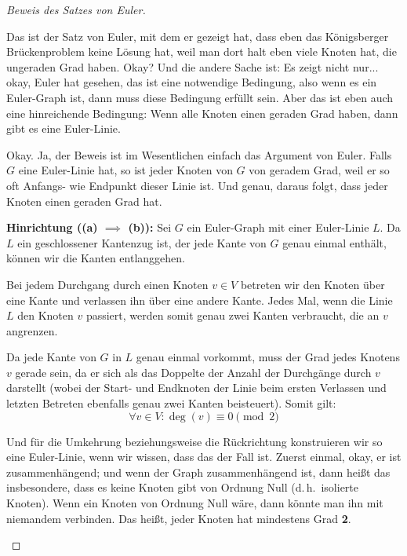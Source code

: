 \begin{proof}[Beweis des Satzes von Euler]
\begin{spoken-clean}[00:08:55 - 00:11:15]
Das ist der Satz von Euler, mit dem er gezeigt hat, dass eben das Königsberger Brückenproblem keine Lösung hat, weil man dort halt eben viele Knoten hat, die ungeraden Grad haben. Okay? Und die andere Sache ist: Es zeigt nicht nur... okay, Euler hat gesehen, das ist eine notwendige Bedingung, also wenn es ein Euler-Graph ist, dann muss diese Bedingung erfüllt sein. Aber das ist eben auch eine hinreichende Bedingung: Wenn alle Knoten einen geraden Grad haben, dann gibt es eine Euler-Linie.

Okay. Ja, der Beweis ist im Wesentlichen einfach das Argument von Euler. Falls $G$ eine Euler-Linie hat, so ist jeder Knoten von $G$ von geradem Grad, weil er so oft Anfangs- wie Endpunkt dieser Linie ist.  Und genau, daraus folgt, dass jeder Knoten einen geraden Grad hat.
\end{spoken-clean}

\begin{math-stroke}
\textbf{Hinrichtung (\texorpdfstring{\textbf{(a)} $\implies$ \textbf{(b)}}{a -> b}):}
Sei $G$ ein Euler-Graph mit einer Euler-Linie $L$. Da $L$ ein geschlossener Kantenzug ist, der jede Kante von $G$ genau einmal enthält, können wir die Kanten entlanggehen. 

Bei jedem Durchgang durch einen Knoten $v \in V$ betreten wir den Knoten über eine Kante und verlassen ihn über eine andere Kante. Jedes Mal, wenn die Linie $L$ den Knoten $v$ passiert, werden somit genau zwei Kanten verbraucht, die an $v$ angrenzen. 

Da jede Kante von $G$ in $L$ genau einmal vorkommt, muss der Grad jedes Knotens $v$ gerade sein, da er sich als das Doppelte der Anzahl der Durchgänge durch $v$ darstellt (wobei der Start- und Endknoten der Linie beim ersten Verlassen und letzten Betreten ebenfalls genau zwei Kanten beisteuert). Somit gilt:
\[
\forall v \in V \colon \deg(v) \equiv 0 \pmod 2
\]
\end{math-stroke}

\begin{spoken-clean}[00:11:15 - 00:13:38]
Und für die Umkehrung beziehungsweise die Rückrichtung konstruieren wir so eine Euler-Linie, wenn wir wissen, dass das der Fall ist. Zuerst einmal, okay, er ist zusammenhängend; und wenn der Graph zusammenhängend ist, dann heißt das insbesondere, dass es keine Knoten gibt von Ordnung Null (d.\,h.\ isolierte Knoten). Wenn ein Knoten von Ordnung Null wäre, dann könnte man ihn mit niemandem verbinden. Das heißt, jeder Knoten hat mindestens Grad \textbf{2}. 


\end{spoken-clean}
\end{proof}
